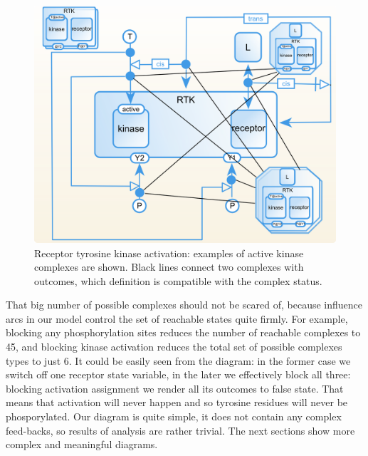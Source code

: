 \begin{figure}[H]
  \centering
  \vspace*{-0.75em}
  \includegraphics[scale=0.75]{examples/rtk-complex.png}
   \caption{Receptor tyrosine kinase activation: examples of active kinase complexes are shown. Black lines connect two complexes with outcomes, which definition is compatible with the complex status.}
  \label{fig:rtk-complexes}
\end{figure}

That big number of possible complexes should not be scared of, because influence arcs in our model control the set of reachable states quite firmly. For example, blocking any phosphorylation sites reduces the number of reachable complexes to 45, and blocking kinase activation reduces the total set of possible complexes types to just 6. It could be easily seen from the diagram: in the former case we switch off one receptor state variable, in the later we effectively block all three: blocking activation assignment we render all its outcomes to false state. That means that activation will never happen and so tyrosine residues will never be phosporylated. Our diagram is quite simple, it does not contain any complex feed-backs, so results of analysis are rather trivial. The next sections show more complex and meaningful diagrams.
